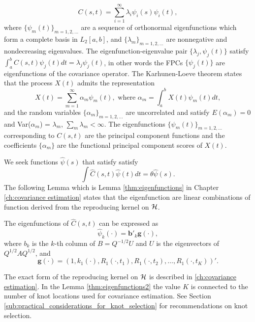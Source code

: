 \begin{equation*}
	C(s,t) = \sum_{i=1}^{\infty}\lambda_i\psi_i(s)\psi_i(t), 
\end{equation*}
where $\{\psi_m(t)\}_{m=1,2,\ldots}$ are a sequence of orthonormal eigenfunctions which form a complete basis in $L_2[a,b]$, and $\{\lambda_m \}_{m=1,2,\ldots}$ are nonnegative and nondecreasing eigenvalues. The eigenfunction-eigenvalue pair $\{\lambda_j, \psi_j(t)\}$ satisfy $\int_a^bC(s,t)\psi_j(t)dt = \lambda_j\psi_j(t)$, in other words the FPCs $\{\psi_j(t)\}$ are eigenfunctions of the covariance operator. The Karhunen-Loeve theorem states that the process $X(t)$ admits the representation 
\begin{equation*}
	X(t) = \sum_{m=1}^{\infty}\alpha_m \psi_m(t), \mbox{ where } \alpha_m = \int_a^b X(t) \psi_m(t)dt, 
\end{equation*}
and the random variables $\{\alpha_m \}_{m=1,2,\ldots}$ are uncorrelated and satisfy $E(\alpha_m)=0$ and Var($\alpha_m$) = $\lambda_m$, $\sum_m \lambda_m < \infty$. The eigenfunctions $\{\psi_m(t)\}_{m=1,2,\ldots}$ corresponding to $C(s,t)$ are the principal component functions and the coefficients $\{\alpha_m \}$ are the functional principal component scores of $X(t)$.

We seek functions $\hat{\psi}(s)$ that satisfy satisfy 
\begin{equation}
	\label{eq:eigenfuns} \int \hat{C}(s,t)\hat{\psi}(t)dt=\theta\hat{\psi}(s). \nonumber
\end{equation}
The following Lemma which is Lemma \ref{thm:eigenfunctions} in Chapter \ref{ch:covariance estimation} states that the eigenfunction are linear combinations of function derived from the reproducing kernel on $\mathcal{H}$. 
\begin{lemma}
	\label{thm:eigenfunctions2} The eigenfunctions of $\hat{C}(s,t)$ can be expressed as 
	\begin{equation*}
		\hat{\psi}_k(\cdot) = \mathbf{b}'_k\mathbf{g}(\cdot), 
	\end{equation*}
	where $b_k$ is the $k$-th column of $B=Q^{-1/2}U$ and $U$ is the eigenvectors of $Q^{1/2}AQ^{1/2}$, and
	\[ \mathbf{g(\cdot)}=(1, k_1(\cdot),R_{1}(\cdot, t_1),R_{1}(\cdot, t_2),\dots, R_{1}(\cdot, t_K))'. \]
\end{lemma}
The exact form of the reproducing kernel on $\mathcal{H}$ is described in \ref{ch:covariance estimation}. In the Lemma \ref{thm:eigenfunctions2} the value $K$ is connected to the number of knot locations used for covariance estimation. See Section \ref{sub:practical_considerations_for_knot_selection} for recommendations on knot selection.

